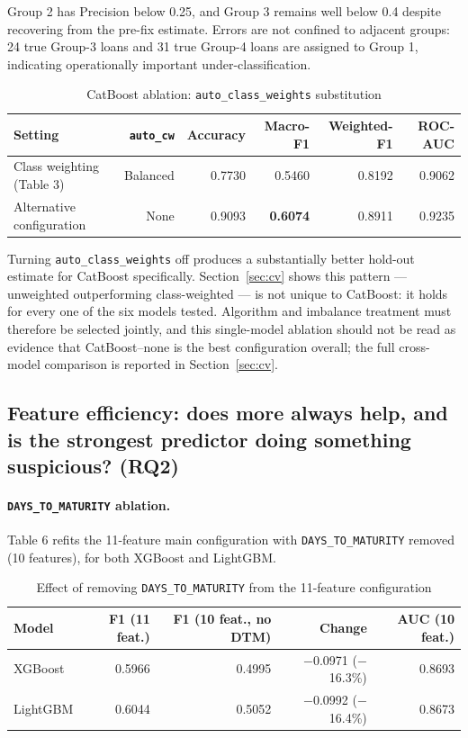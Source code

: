 \documentclass[11pt,a4paper]{article}
\begin{document}
Group 2 has Precision below 0.25, and Group 3 remains well below 0.4 despite recovering from the pre-fix estimate. Errors are not confined to adjacent groups: 24 true Group-3 loans and 31 true Group-4 loans are assigned to Group 1, indicating operationally important under-classification.

\begin{table}[H]
\centering
\caption{CatBoost ablation: \texttt{auto\_class\_weights} substitution}
\small
\begin{tabular}{lrrrrr}
\toprule
Setting & \texttt{auto\_cw} & Accuracy & Macro-F1 & Weighted-F1 & ROC-AUC \\
\midrule
Class weighting (Table 3) & Balanced & 0.7730 & 0.5460 & 0.8192 & 0.9062 \\
Alternative configuration & None & 0.9093 & \textbf{0.6074} & 0.8911 & 0.9235 \\
\bottomrule
\end{tabular}
\end{table}

Turning \texttt{auto\_class\_weights} off produces a substantially better hold-out estimate for CatBoost specifically. Section~\ref{sec:cv} shows this pattern --- unweighted outperforming class-weighted --- is not unique to CatBoost: it holds for every one of the six models tested. Algorithm and imbalance treatment must therefore be selected jointly, and this single-model ablation should not be read as evidence that CatBoost--none is the best configuration overall; the full cross-model comparison is reported in Section~\ref{sec:cv}.

\subsection{Feature efficiency: does more always help, and is the strongest predictor doing something suspicious? (RQ2)}

\paragraph{\texttt{DAYS\_TO\_MATURITY} ablation.} Table 6 refits the 11-feature main configuration with \texttt{DAYS\_TO\_MATURITY} removed (10 features), for both XGBoost and LightGBM.

\begin{table}[H]
\centering
\caption{Effect of removing \texttt{DAYS\_TO\_MATURITY} from the 11-feature configuration}
\small
\begin{tabular}{lrrrr}
\toprule
Model & F1 (11 feat.) & F1 (10 feat., no DTM) & Change & AUC (10 feat.) \\
\midrule
XGBoost  & 0.5966 & 0.4995 & $-$0.0971 ($-$16.3\%) & 0.8693 \\
LightGBM & 0.6044 & 0.5052 & $-$0.0992 ($-$16.4\%) & 0.8673 \\
\bottomrule
\end{tabular}
\end{table}
\end{document}
